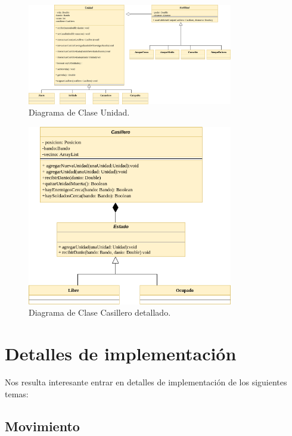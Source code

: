 \documentclass[titlepage,a4paper]{article}
\begin{document}
\begin{figure}[H]
\centering
\includegraphics[width=0.8\textwidth]{DiagramaClaseUnidad.png}
\caption{\label{fig:class01}Diagrama de Clase Unidad.}
\end{figure}


\begin{figure}[H]
\centering
\includegraphics[width=0.8\textwidth]{DDiagEstado.png}
\caption{\label{fig:class01}Diagrama de Clase Casillero detallado.}
\end{figure}



\section{Detalles de implementación}\label{sec:implementacion}

Nos resulta interesante entrar en detalles de implementación de los siguientes temas: 


\subsection{Movimiento}
\end{document}
